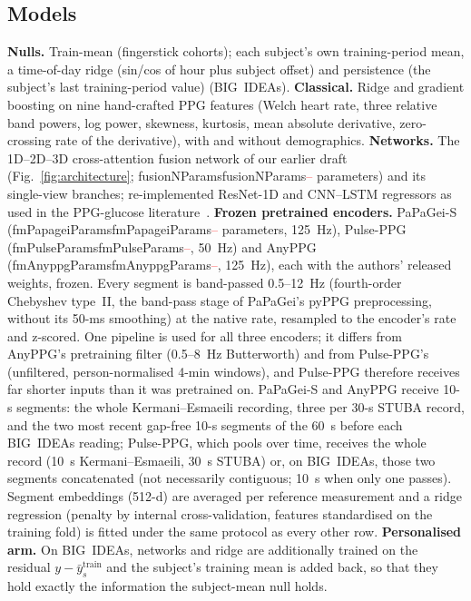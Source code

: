 \documentclass[journal]{IEEEtran}
\newcommand{\m}[1]{\ifcsname #1\endcsname\csname #1\endcsname\else\textcolor{red}{--}\fi}
\begin{document}
\subsection{Models}
\textbf{Nulls.}  Train-mean (fingerstick cohorts); each subject's own
training-period mean, a time-of-day ridge (sin/cos of hour plus subject
offset) and persistence (the subject's last training-period value)
(BIG~IDEAs).  \textbf{Classical.}  Ridge and gradient boosting on nine
hand-crafted PPG features (Welch heart rate, three relative band powers, log
power, skewness, kurtosis, mean absolute derivative, zero-crossing rate of
the derivative), with and without demographics.  \textbf{Networks.}  The
1D--2D--3D cross-attention fusion network of our earlier draft
(Fig.~\ref{fig:architecture}; \m{fusionNParams} parameters) and its single-view
branches; re-implemented ResNet-1D and CNN--LSTM regressors as used in the
PPG-glucose literature~\cite{zeynali2025,syamsul2026}.  \textbf{Frozen
pretrained encoders.}  PaPaGei-S~\cite{papagei2025} (\m{fmPapageiParams}
parameters, 125~Hz), Pulse-PPG~\cite{pulseppg2025} (\m{fmPulseParams}, 50~Hz)
and AnyPPG~\cite{anyppg2026} (\m{fmAnyppgParams}, 125~Hz), each with the
authors' released weights, frozen.  Every segment is band-passed
0.5--12~Hz (fourth-order Chebyshev type~II, the band-pass stage of
PaPaGei's pyPPG preprocessing, without its 50-ms smoothing) at the native
rate, resampled to the encoder's rate and z-scored.  One pipeline is used
for all three encoders; it differs from AnyPPG's pretraining filter
(0.5--8~Hz Butterworth) and from Pulse-PPG's (unfiltered, person-normalised
4-min windows), and Pulse-PPG therefore receives far shorter inputs than it
was pretrained on.  PaPaGei-S and AnyPPG receive 10-s segments: the whole
Kermani--Esmaeili recording, three per 30-s STUBA record, and the two most
recent gap-free 10-s segments of the 60~s before each BIG~IDEAs reading;
Pulse-PPG, which pools over time, receives the whole record (10~s
Kermani--Esmaeili, 30~s STUBA) or, on BIG~IDEAs, those two segments
concatenated (not necessarily contiguous; 10~s when only one passes).  Segment embeddings (512-d) are averaged per reference measurement
and a ridge regression (penalty by internal cross-validation, features
standardised on the training fold) is fitted under the same protocol as
every other row.  \textbf{Personalised arm.}
On BIG~IDEAs, networks and ridge are additionally trained on the residual
$y-\bar{y}_s^{\mathrm{train}}$ and the subject's training mean is added back,
so that they hold exactly the information the subject-mean null holds.
\end{document}
